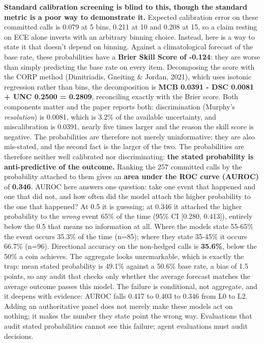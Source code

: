 \documentclass[10pt]{article}
\begin{document}
\textbf{Standard calibration screening is blind to this, though the standard metric is a poor way to demonstrate it.} Expected calibration error on these committed calls is 0.079 at 5 bins, 0.211 at 10 and 0.208 at 15, so a claim resting on ECE alone inverts with an arbitrary binning choice. Instead, here is a way to state it that doesn't depend on binning. Against a climatological forecast of the base rate, these probabilities have a \textbf{Brier Skill Score of -0.124}: they are worse than simply predicting the base rate on every item. Decomposing the score with the CORP method (Dimitriadis, Gneiting \& Jordan, 2021), which uses isotonic regression rather than bins, the decomposition is \textbf{MCB 0.0391 - DSC 0.0081 + UNC 0.2500 = 0.2809}, reconciling exactly with the Brier score. Both components matter and the paper reports both: discrimination (Murphy's \textit{resolution}) is 0.0081, which is 3.2\% of the available uncertainty, and miscalibration is 0.0391, nearly five times larger and the reason the skill score is negative. The probabilities are therefore not merely uninformative; they are also mis-stated, and the second fact is the larger of the two. The probabilities are therefore neither well calibrated nor discriminating: \textbf{the stated probability is anti-predictive of the outcome.} Ranking the 257 committed calls by the probability attached to them gives an \textbf{area under the ROC curve (AUROC)} of \textbf{0.346}. AUROC here answers one question: take one event that happened and one that did not, and how often did the model attach the higher probability to the one that happened? At 0.5 it is guessing; at 0.346 it attached the higher probability to the \textit{wrong} event 65\% of the time (95\% CI [0.280, 0.413]), entirely below the 0.5 that means no information at all. Where the models state 55-65\% the event occurs 35.3\% of the time (n=85); where they state 35-45\% it occurs 66.7\% (n=96). Directional accuracy on the non-hedged calls is \textbf{35.6\%}, below the 50\% a coin achieves. The aggregate looks unremarkable, which is exactly the trap: mean stated probability is 49.1\% against a 50.6\% base rate, a bias of 1.5 points, so any audit that checks only whether the average forecast matches the average outcome passes this model. The failure is conditional, not aggregate, and it deepens with evidence: AUROC falls 0.417 to 0.403 to 0.346 from L0 to L2. Adding an authoritative panel does not merely make these models act on nothing; it makes the number they state point the wrong way. Evaluations that audit stated probabilities cannot see this failure; agent evaluations must audit decisions.
\end{document}
